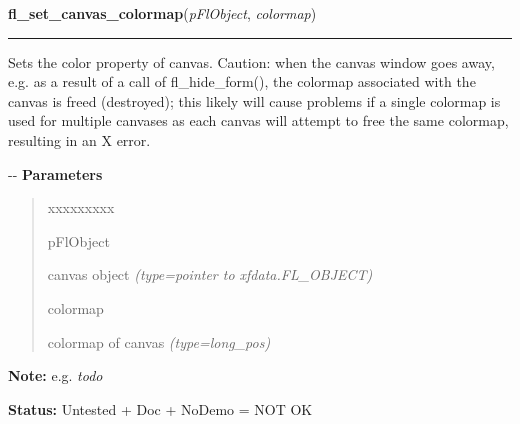     \label{xformslib:flcanvas:fl_set_canvas_colormap}

    \vspace{0.5ex}

\hspace{.8\funcindent}\begin{boxedminipage}{\funcwidth}

    \raggedright \textbf{fl\_set\_canvas\_colormap}(\textit{pFlObject}, \textit{colormap})

    \vspace{-1.5ex}

    \rule{\textwidth}{0.5\fboxrule}
\setlength{\parskip}{2ex}

Sets the color property of canvas. Caution: when the canvas window goes
away, e.g. as a result of a call of fl\_hide\_form(), the colormap associated
with the canvas is freed (destroyed); this likely will cause problems if a
single colormap is used for multiple canvases as each canvas will attempt
to free the same colormap, resulting in an X error.

-{}-
\setlength{\parskip}{1ex}
      \textbf{Parameters}
      \vspace{-1ex}

      \begin{quote}
        \begin{Ventry}{xxxxxxxxx}

          \item[pFlObject]


canvas object
            {\it (type=pointer to xfdata.FL\_OBJECT)}

          \item[colormap]


colormap of canvas
            {\it (type=long\_pos)}

        \end{Ventry}

      \end{quote}

\textbf{Note:} 
e.g. \emph{todo}


\textbf{Status:} 
Untested + Doc + NoDemo = NOT OK


    \end{boxedminipage}

    \label{xformslib:flcanvas:fl_set_canvas_visual}

